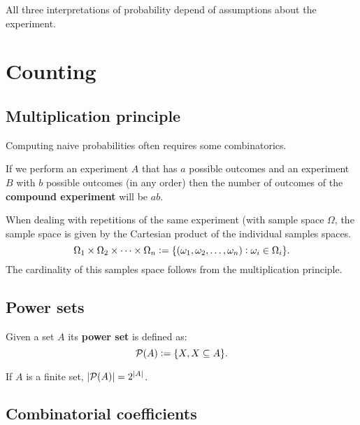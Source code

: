 \begin{remark}
    All three interpretations of probability depend of assumptions about the experiment.
\end{remark}


\section{Counting}
\subsection{Multiplication principle}
Computing naive probabilities often requires some combinatorics.

\begin{definition}
    If we perform an experiment $A$ that has $a$ possible outcomes and an experiment $B$ with $b$ possible outcomes (in any order) then the number of outcomes of the  \textbf{compound experiment} will be $ab$.
\end{definition}

\begin{remark}
    When dealing with repetitions of the same experiment (with sample space $\Omega$, the sample space is given by the Cartesian product of the individual samples spaces.
    \[
        \Omega_1 \times \Omega_2 \times \cdots \times \Omega_n :=  \{(\omega_1,\omega_2,\ldots,\omega_n): \omega_i \in \Omega_i\}\textcolor{black}{.}
    \]
    The cardinality of this samples space follows from the multiplication principle.
\end{remark}

\subsection{Power sets}
\begingroup\belowdisplayskip=-10pt
    \begin{definition}
        Given a set $A$ its \textbf{power set} is defined as:
        \[
            \mathcal{P}(A) := \{X,X\subseteq A\}\textcolor{black}{.}
        \]
    \end{definition}
\endgroup

\begin{theorem}
    If $A$ is a finite set, $|\mathcal{P}(A)|=2^{|A|}$.
\end{theorem}

\subsection{Combinatorial coefficients}

